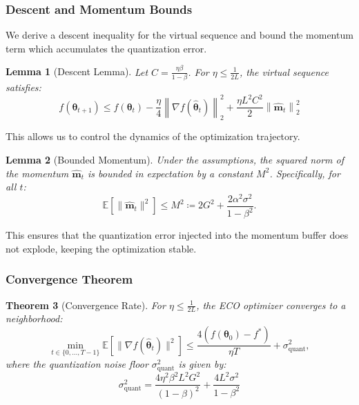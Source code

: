 \documentclass[11pt, a4paper, onecolumn, copyright, goog]{google}
\newcommand{\vect}[1]{\mathbf{#1}}
\newcommand{\vtheta}{\boldsymbol{\theta}}
\newcommand{\vm}{\vect{m}}
\newcommand{\norm}[1]{\left\lVert#1\right\rVert_2}
\newcommand{\E}{\mathbb{E}}
\theoremstyle{plain}
\newtheorem{theorem}{Theorem}[section]
\newtheorem{lemma}[theorem]{Lemma}
\theoremstyle{definition}
\theoremstyle{remark}
\begin{document}
\subsubsection{Descent and Momentum Bounds}

We derive a descent inequality for the virtual sequence and bound the momentum term which accumulates the quantization error.

\begin{lemma}[Descent Lemma]
\label{lemma:descent}
Let $C = \frac{\eta \beta}{1-\beta}$. For $\eta \le \frac{1}{2L}$, the virtual sequence satisfies:
\begin{equation} \label{eq:descent_lemma_main}
    f(\vtheta_{t+1}) \le f(\vtheta_t) - \frac{\eta}{4} \norm{\nabla f(\hat{\vtheta}_t)}^2 + \frac{\eta L^2 C^2}{2} \norm{\hat{\vm}_t}^2
\end{equation}
\end{lemma}
This allows us to control the dynamics of the optimization trajectory.

\begin{lemma}[Bounded Momentum]
\label{lemma:momentum_bound}
Under the assumptions, the squared norm of the momentum $\hat{\vm}_t$ is bounded in expectation by a constant $M^2$. Specifically, for all $t$:
\begin{equation}
    \E[\|\hat{\vm}_t\|^2] \le M^2 \coloneqq 2G^2 + \frac{2\alpha^2 \sigma^2}{1-\beta^2}.
\end{equation}
\end{lemma}
This ensures that the quantization error injected into the momentum buffer does not explode, keeping the optimization stable.

\subsubsection{Convergence Theorem}

\begin{theorem}[Convergence Rate]
\label{thm:convergence}
For $\eta \le \frac{1}{2L}$, the ECO optimizer converges to a neighborhood:
\begin{equation}
    \min_{t \in \{0, \dots, T-1\}} \E \left[\|\nabla f(\hat{\vtheta}_t)\|^2 \right] \le \frac{4(f(\vtheta_0) - f^*)}{\eta T} + \sigma_{\text{quant}}^2,
\end{equation}
where the quantization noise floor $\sigma_{\text{quant}}^2$ is given by:
\begin{equation}
    \sigma_{\text{quant}}^2 = \frac{4 \eta^2 \beta^2 L^2 G^2}{(1-\beta)^2} + \frac{4L^2 \sigma^2}{1-\beta^2}
\end{equation}
\end{theorem}
\end{document}
